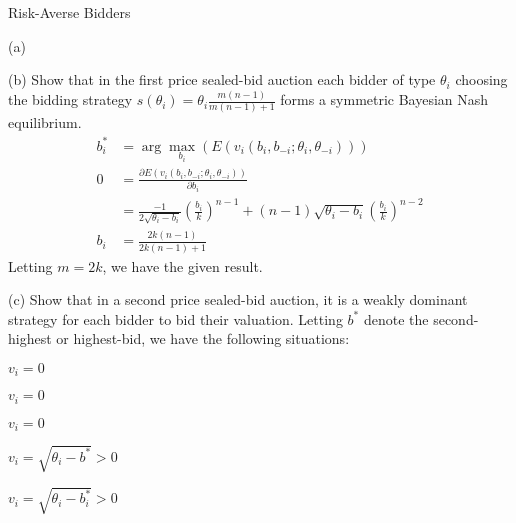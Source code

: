 \documentclass[9pt]{extarticle}
\begin{document}
\begin{problem}{Risk-Averse Bidders}
\begin{problem}{(a)}
\begin{description}
      \end{description}
    \end{problem}
    \begin{problem}{(b)}
      Show that in the first price sealed-bid auction each bidder of type $\theta_i$ choosing the bidding strategy $s(\theta_i) = \theta_i\frac{m(n-1)}{m(n-1)+1}$ forms a symmetric Bayesian Nash equilibrium.
      \tcblower
      \begin{align*}
        b_i^* &= \arg\max_{b_i}\left(E\left(v_i(b_i,b_{-i};\theta_i,\theta_{-i})\right)\right)\\
        0 &= \frac{\partial E(v_i(b_i,b_{-i};\theta_i,\theta_{-i}))}{\partial b_i}\\
          &= \frac{-1}{2\sqrt{\theta_i - b_i}}\left(\frac{b_i}{k}\right)^{n-1} + (n-1)\sqrt{\theta_i - b_i}\left(\frac{b_i}{k}\right)^{n-2}\\
          b_i &= \frac{2k(n-1)}{2k(n-1) + 1}
      \end{align*}
      Letting $m=2k$, we have the given result.
    \end{problem}
    \begin{problem}{(c)}
      Show that in a second price sealed-bid auction, it is a weakly dominant strategy for each bidder to bid their valuation.
      \tcblower
      Letting $b^*$ denote the second-highest or highest-bid, we have the following situations:
      \begin{description}[font=\normalfont]
        \item[$b_i < \theta_i < b^*$:]\hfill
          \begin{description}[font=\normalfont]
            \item[Follow:] $v_i = 0$
            \item[Deviate to $\theta_i$:] $v_i = 0$
          \end{description}
        \item[$b_i <  b^*<\theta_i $:]\hfill
          \begin{description}[font=\normalfont]
            \item[Follow:] $v_i = 0$
            \item[Deviate to $\theta_i$:] $v_i = \sqrt{\theta_i - b^*} > 0$
          \end{description}
        \item[$b^*<\theta_i < b_i $:]\hfill
          \begin{description}[font=\normalfont]
            \item[Follow:] $v_i = \sqrt{\theta_i - b_i^*} > 0$

\end{description}
\end{description}
\end{problem}
\end{problem}
\end{document}
